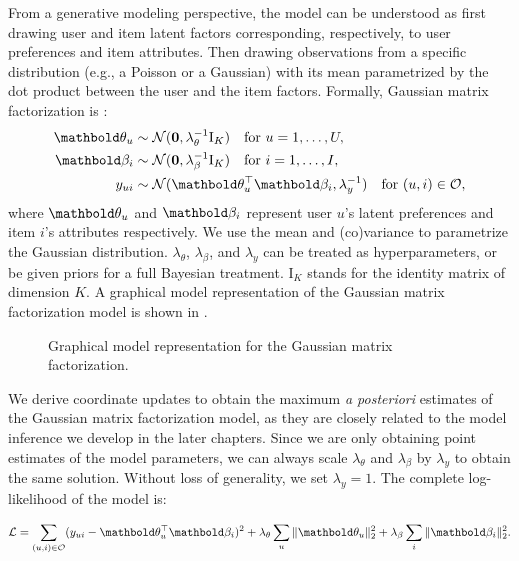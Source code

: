 From a generative modeling perspective, the model can be understood as first drawing user and item latent factors corresponding,
respectively, to user preferences and item attributes. Then drawing 
observations from a specific distribution (e.g., a Poisson
or a Gaussian) with its mean parametrized by the dot product between the user and
the item factors. Formally, Gaussian matrix factorization is \citep{mnih2007probabilistic}: 
\begin{equation} 
\begin{split}
	\mb\theta_{u} &\sim \mathcal{N}(\bzero, \lambda_\theta^{-1} \mathrm{I}_K) \quad \textrm{for } u = 1, \dots, U, \\
	\mb\beta_{i} &\sim \mathcal{N}(\bzero, \lambda_\beta^{-1} \mathrm{I}_K) \quad \textrm{for } i = 1, \dots, I, \\
	y_{ui} &\sim \mathcal{N}(\mb\theta_u^\top \mb\beta_i, \lambda_y^{-1}) \quad \textrm{for } (u, i) \in \cO, 
 \end{split}
 \label{chpt:background:eq:gmf}
 \end{equation}
where $\mb\theta_u$ and $\mb\beta_i$ represent user $u$'s latent preferences and item $i$'s attributes respectively. We use the mean and (co)variance to
parametrize the Gaussian distribution. $\lambda_\theta$, $\lambda_\beta$, and
$\lambda_y$ can be treated as hyperparameters, or be given priors for a full Bayesian treatment. $\mathrm{I}_K$ stands for the identity
matrix of dimension $K$. A graphical model representation of the Gaussian matrix factorization model is shown in .

\begin{figure}[ht]
  \centering
     
  \caption{Graphical model representation for the Gaussian matrix factorization.}
\label{chpt:background:fig:gmf}
\end{figure}

We derive coordinate updates to obtain the maximum \textit{a posteriori} estimates of the Gaussian matrix factorization model, as they are closely related to the model inference we develop in the later chapters. Since we are only obtaining point estimates of the model parameters, we can always scale $\lambda_\theta$ and $\lambda_\beta$ by $\lambda_y$ to obtain the same solution. Without loss of generality, we set $\lambda_y = 1$. The complete log-likelihood of the model is:

\begin{equation}
\cL = \sum_{(u, i)\in \cO} (y_{ui} - \mb\theta_u^\top\mb\beta_i)^2 + \lambda_\theta \sum_u \|\mb\theta_u \|^2_2 + \lambda_\beta \sum_i \|\mb\beta_i \|_2^2.
\label{chpt:background:eq:gmf_logll}
\end{equation}

